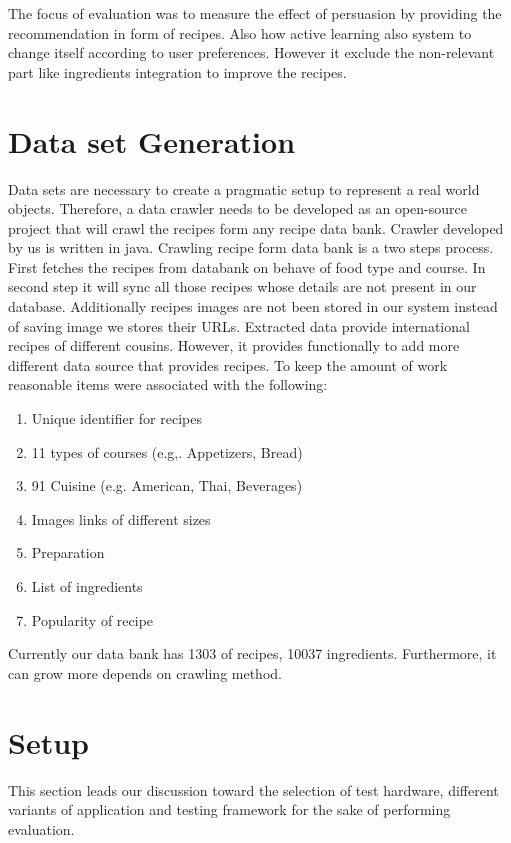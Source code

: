 The focus of evaluation was to measure the effect of persuasion by providing the recommendation in form of recipes. Also how active learning also system to change itself according to user preferences. However it exclude the non-relevant part like ingredients integration to improve the recipes.

\section{Data set Generation}

Data sets are necessary to create a pragmatic setup to represent a real world objects. Therefore, a data crawler needs to be developed as an open-source project that will crawl the recipes form any recipe data bank. Crawler developed by us is written in java.  Crawling recipe form data bank is a two steps process.  First fetches the recipes from databank on behave of food type and course.  In second step it will sync all those recipes whose details are not present in our database. Additionally recipes images are not been stored in our system instead of saving image we stores their URLs. Extracted data provide international recipes of different cousins. However, it provides functionally to add more different data source that provides recipes. To keep the amount of work reasonable items were associated with the following:

\begin{enumerate}
	\item Unique identifier for recipes
	\item 11 types of courses (e.g,. Appetizers, Bread)
	\item 91 Cuisine (e.g. American, Thai, Beverages)
	\item Images links of different sizes
	\item Preparation
	\item List of ingredients
	\item Popularity of recipe
\end{enumerate}

Currently our data bank has 1303 of recipes, 10037 ingredients. Furthermore, it can grow more depends on crawling method.

\section{Setup}

This section leads our discussion toward the selection of test hardware, different variants of application and testing framework for the sake of performing evaluation.

